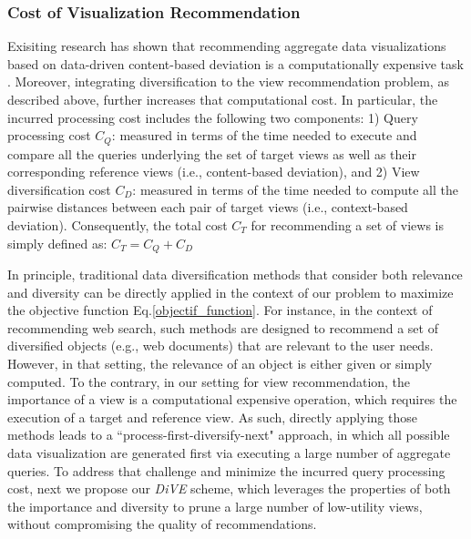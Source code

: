 \vspace{-7pt}
\subsubsection{Cost of Visualization Recommendation}

Exisiting research has shown that recommending aggregate data visualizations based on data-driven content-based deviation is a computationally expensive task \cite{Vartak2014, Vartak2015, Ehsan2016}.
%
Moreover, integrating diversification to the view recommendation problem, as described above, further increases that computational cost.
%
In particular, the incurred processing cost includes the following two components: 1) Query processing cost $C_Q$: measured in terms of the time needed to execute and compare all the queries underlying the set of target views as well as their corresponding reference views (i.e., content-based deviation), and 2) View diversification cost $C_D$: measured in terms of the time needed to compute all the pairwise distances between each pair of target views (i.e., context-based deviation).
%
Consequently, the total cost $C_T$ for recommending a set of views is simply defined as: $C_T= C_Q + C_D$

In principle, traditional data diversification methods that consider both relevance and diversity can be directly applied in the context of our problem to maximize the objective function Eq.\ref{objectif_function}.
%
For instance, in the context of recommending web search, such methods are designed to recommend a set of diversified objects (e.g., web documents) that are relevant to the user needs. 
%
However, in that setting, the relevance of an object is either given or simply computed.
%
To the contrary, in our setting for view recommendation, the importance of a view is a computational expensive operation, which requires the execution of a target and reference view. 
%
As such, directly applying those methods leads to a ``process-first-diversify-next" approach, in which all possible data visualization are generated first via executing a large number of aggregate queries. 
%
To address that challenge and minimize the incurred query processing cost, next we propose our {\em DiVE} scheme, which leverages the properties of both the importance and diversity to prune a large number of low-utility views, without compromising the quality of recommendations. 

